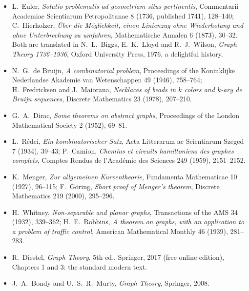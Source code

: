 \begin{itemize}
\item L.~Euler, \emph{Solutio problematis ad geometriam situs pertinentis}, Commentarii Academiae Scientiarum Petropolitanae 8
(1736, published 1741), 128--140; C.~Hierholzer, \emph{\"Uber die M\"oglichkeit, einen Linienzug ohne Wiederholung und ohne
Unterbrechung zu umfahren}, Mathematische Annalen 6 (1873), 30--32. Both are translated in N.~L.~Biggs, E.~K.~Lloyd and
R.~J.~Wilson, \emph{Graph Theory 1736--1936}, Oxford University Press, 1976, a delightful history.
\item N.~G.~de Bruijn, \emph{A combinatorial problem}, Proceedings of the Koninklijke Nederlandse Akademie van Wetenschappen 49
(1946), 758--764; H.~Fredricksen and J.~Maiorana, \emph{Necklaces of beads in $k$ colors and $k$-ary de Bruijn sequences}, Discrete
Mathematics 23 (1978), 207--210.
\item G.~A.~Dirac, \emph{Some theorems on abstract graphs}, Proceedings of the London Mathematical Society 2 (1952), 69--81.
\item L.~R\'edei, \emph{Ein kombinatorischer Satz}, Acta Litterarum ac Scientiarum Szeged 7 (1934), 39--43; P.~Camion,
\emph{Chemins et circuits hamiltoniens des graphes complets}, Comptes Rendus de l'Acad\'emie des Sciences 249 (1959), 2151--2152.
\item K.~Menger, \emph{Zur allgemeinen Kurventheorie}, Fundamenta Mathematicae 10 (1927), 96--115; F.~G\"oring, \emph{Short proof
of Menger's theorem}, Discrete Mathematics 219 (2000), 295--296.
\item H.~Whitney, \emph{Non-separable and planar graphs}, Transactions of the AMS 34 (1932), 339--362; H.~E.~Robbins, \emph{A
theorem on graphs, with an application to a problem of traffic control}, American Mathematical Monthly 46 (1939), 281--283.
\item R.~Diestel, \emph{Graph Theory}, 5th ed., Springer, 2017 (free online edition), Chapters 1 and 3: the standard modern text.
\item J.~A.~Bondy and U.~S.~R.~Murty, \emph{Graph Theory}, Springer, 2008.
\end{itemize}
